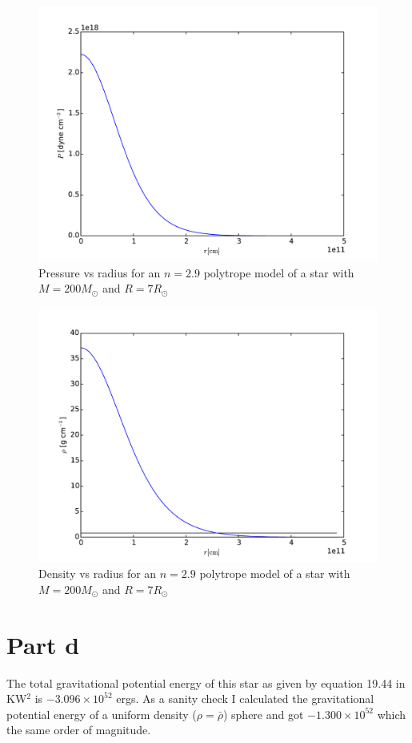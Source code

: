 \documentclass[12pt]{article}
\begin{document}
\begin{figure}[htbp]
\begin{center}
\includegraphics[width=\textwidth]{pressure2p9.pdf}
\caption{Pressure vs radius for an $n=2.9$ polytrope model of a star with $M=200M_\odot$ and $R=7R_\odot$}
\label{fig:P}
\end{center}
\end{figure}

\begin{figure}[htbp]
\begin{center}
\includegraphics[width=\textwidth,keepaspectratio]{density2p9.pdf}
\caption{Density vs radius for an $n=2.9$ polytrope model of a star with $M=200M_\odot$ and $R=7R_\odot$}
\label{fig:p}
\end{center}
\end{figure}

\section{Part d}
The total gravitational potential energy of this star as given by equation 19.44 in KW$^2$ is $-3.096\times10^{52}$ ergs. As a sanity check I calculated the gravitational potential energy of a uniform density ($\rho=\bar{\rho}$) sphere and got $-1.300\times10^{52}$ which the same order of magnitude.
\end{document}

